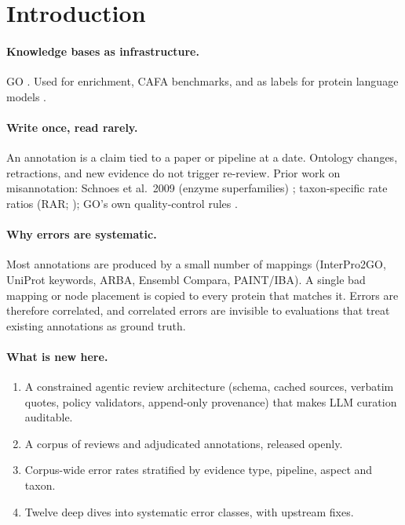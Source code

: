 \section{Introduction}\label{sec:intro}


\paragraph{Knowledge bases as infrastructure.} GO \citep{todo-go2023} . Used for enrichment, CAFA benchmarks, and as labels for
protein language models .

\paragraph{Write once, read rarely.} An annotation is a claim tied to a paper or pipeline at a
date. Ontology changes, retractions, and new evidence do not trigger re-review. Prior work on
misannotation: Schnoes et al.\ 2009 (enzyme superfamilies) ; taxon-specific rate
ratios (RAR; \citealp{todo-wei2020}); GO's own quality-control rules .

\paragraph{Why errors are systematic.} Most annotations are produced by a small number of
mappings (InterPro2GO, UniProt keywords, ARBA, Ensembl Compara, PAINT/IBA). A single bad mapping
or node placement is copied to every protein that matches it. Errors are therefore correlated, and
correlated errors are invisible to evaluations that treat existing annotations as ground truth.

\paragraph{What is new here.} 
\begin{enumerate}[nosep]
  \item A constrained agentic review architecture (schema, cached sources, verbatim quotes,
        policy validators, append-only provenance) that makes LLM curation auditable.
  \item A corpus of \nReviews{} reviews and \nAnn{} adjudicated annotations, released openly.
  \item Corpus-wide error rates stratified by evidence type, pipeline, aspect and taxon.
  \item Twelve deep dives into systematic error classes, with upstream fixes.
\end{enumerate}

